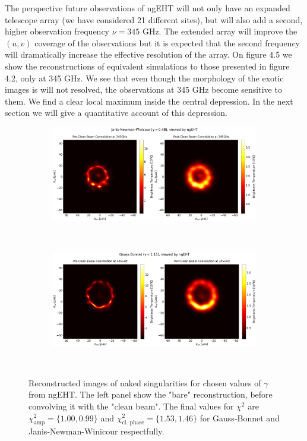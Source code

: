 \documentclass[12pt]{article}
\numberwithin{equation}{section}
\numberwithin{figure}{section}
\begin{document}
	The perspective future observations of ngEHT will not only have an expanded telescope array (we have considered 21 different sites), but will also add a second, higher observation frequency $\nu = 345$ GHz. The extended array will improve the $(u,v)$ coverage of the observations but it is expected that the second frequency will dramatically increase the effective resolution of the array. On figure 4.5 we show the reconstructions of equivalent simulations to those presented in figure 4.2, only at 345 GHz. We see that even though the morphology of the exotic images is will not resolved, the observations at 345 GHz become sensitive to them. We find a clear local maximum inside the central depression. In the next section we will give a quantitative account of this depression.
	
	\begin{figure}[h!]
		\centering
		\begin{subfigure}{12cm}
			\hspace{-1.5cm}
			\includegraphics[scale = 0.23]{Section_8_Observing_Horizonless_Objects/Ehtim_plot_ngEHT_no_blur_345_JNW.png}
		\end{subfigure}\\
		\begin{subfigure}{12cm}
			\hspace{-1.5cm}
			\includegraphics[scale = 0.23]{Section_8_Observing_Horizonless_Objects/Ehtim_plot_ngEHT_no_blur_345_GB.png}
		\end{subfigure}\\
		\label{Naked_Singularity_EHT_ng2017}
		\caption[Reconstructed images of naked singularities for chosen values of $\gamma$ from ngEHT.]{\small Reconstructed images of naked singularities for chosen values of $\gamma$ from ngEHT. The left panel show the "bare" reconstruction, before convolving it with the "clean beam". The final values for $\chi^2$ are $\chi^2_\text{amp} = \{1.00, 0.99\}$ and $\chi^2_\text{cl. phase} = \{1.53, 1.46\}$ for Gauss-Bonnet and Janis-Newman-Winicour respectfully.} 
	\end{figure}
	
\end{document}
